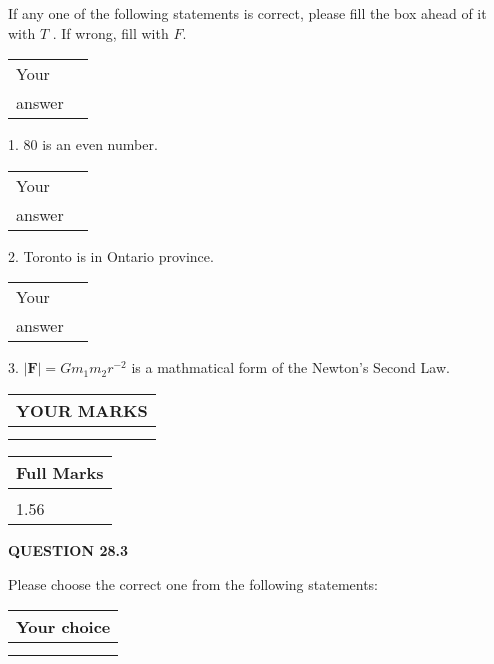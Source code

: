 \documentclass[12pt]{article}
\begin{document}
  
If any one of the following statements is correct, please fill the box ahead of it with $T$ .
If wrong, fill with $F$.
 
\noindent\begin{tabular}{|l|l|}\hline Your&\hspace{.2in} \\ answer&\hspace{.2in} \\ \hline \end{tabular}
1. $ %
80$ is an  %
even number.
 
\noindent\begin{tabular}{|l|l|}\hline Your&\hspace{.2in} \\ answer&\hspace{.2in} \\ \hline \end{tabular}
2.  %
Toronto is in  %
Ontario province.
 
\noindent\begin{tabular}{|l|l|}\hline Your&\hspace{.2in} \\ answer&\hspace{.2in} \\ \hline \end{tabular}
3.  %
$\left| \mathbf{F}\right| =Gm_1m_2r^{-2}$ is a mathmatical form of
the Newton's Second Law.
 

 
\vspace{0.3in}
  
\vspace{0.2in}
  
\noindent\begin{tabular}{|l|}
\hline
 YOUR MARKS  \\
\hline
 \\ 
 \\ 
\hline
\end{tabular}
\hspace{0.05in} \begin{tabular}{|l|}
\hline
 Full Marks  \\
\hline
 \\ 
1.56 \\
\hline
\end{tabular}
{\textbf{\Large{QUESTION
28.3 
}}}
  
  
Please choose the correct one from the following statements:
  
  
\noindent\hspace{3.0in} \begin{tabular}{|l|}
\hline
Your choice \\
\hline
 \\ 
 \\ 
\hline
\end{tabular}
  
\end{document}
